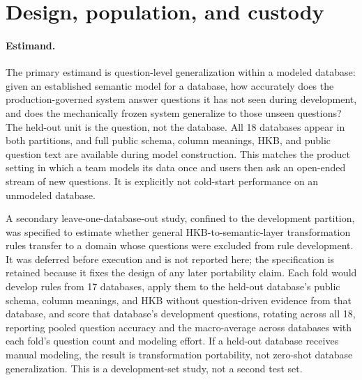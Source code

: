 \section{Design, population, and custody}
\label{sec:design}

\paragraph{Estimand.}
The primary estimand is question-level generalization within a modeled database:
given an established semantic model for a database, how accurately does the
production-governed system answer questions it has not seen during development,
and does the mechanically frozen system generalize to those unseen questions?
The held-out unit is the question, not the
database. All 18 databases appear in both partitions, and full public schema,
column meanings, HKB, and public question text are available during model
construction. This matches the product setting in which a team models its data
once and users then ask an open-ended stream of new questions. It is explicitly
not cold-start performance on an unmodeled database.

A secondary leave-one-database-out study, confined to the development partition,
was specified to estimate whether general HKB-to-semantic-layer transformation
rules transfer to a domain whose questions were excluded from rule development.
It was deferred before execution and is not reported here; the specification is
retained because it fixes the design of any later portability claim. Each fold
would develop rules from 17 databases, apply them to the held-out database's
public schema, column meanings, and HKB without question-driven evidence from
that database, and score that database's development questions, rotating across
all 18, reporting pooled question accuracy and the macro-average across
databases with each fold's question count and modeling effort. If a held-out database receives manual
modeling, the result is transformation portability, not zero-shot database
generalization. This is a development-set study, not a second test set.


